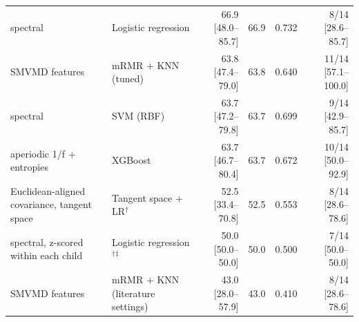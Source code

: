 \begin{tabular}{llrrrr}
spectral & Logistic regression & 66.9 [48.0--85.7] & 66.9 & 0.732 & 8/14 [28.6--85.7] \\
SMVMD features & mRMR + KNN (tuned) & 63.8 [47.4--79.0] & 63.8 & 0.640 & 11/14 [57.1--100.0] \\
spectral & SVM (RBF) & 63.7 [47.2--79.8] & 63.7 & 0.699 & 9/14 [42.9--85.7] \\
aperiodic 1/f + entropies & XGBoost & 63.7 [46.7--80.4] & 63.7 & 0.672 & 10/14 [50.0--92.9] \\
Euclidean-aligned covariance, tangent space & Tangent space + LR$^\dagger$ & 52.5 [33.4--70.8] & 52.5 & 0.553 & 8/14 [28.6--78.6] \\
spectral, z-scored within each child & Logistic regression$^\dagger$$^\ddagger$ & 50.0 [50.0--50.0] & 50.0 & 0.500 & 7/14 [50.0--50.0] \\
SMVMD features & mRMR + KNN (literature settings) & 43.0 [28.0--57.9] & 43.0 & 0.410 & 8/14 [28.6--78.6] \\
\hline
\end{tabular}
